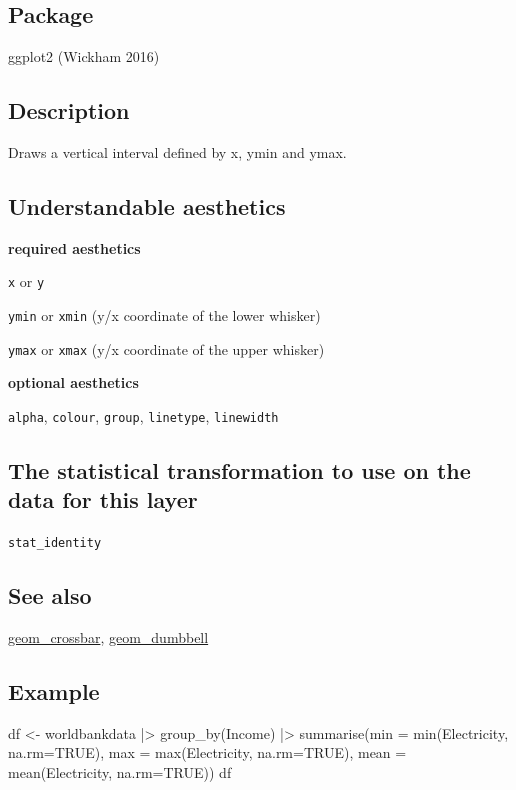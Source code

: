 \documentclass[
  letterpaper,
  DIV=11,
  numbers=noendperiod]{scrreprt}
\newenvironment{Shaded}{\begin{snugshade}}{\end{snugshade}}
\newcommand{\AttributeTok}[1]{\textcolor[rgb]{0.40,0.45,0.13}{#1}}
\newcommand{\ConstantTok}[1]{\textcolor[rgb]{0.56,0.35,0.01}{#1}}
\newcommand{\FunctionTok}[1]{\textcolor[rgb]{0.28,0.35,0.67}{#1}}
\newcommand{\NormalTok}[1]{\textcolor[rgb]{0.00,0.23,0.31}{#1}}
\newcommand{\OtherTok}[1]{\textcolor[rgb]{0.00,0.23,0.31}{#1}}
\newcommand{\SpecialCharTok}[1]{\textcolor[rgb]{0.37,0.37,0.37}{#1}}
\begin{document}
\subsection{Package}\label{package}

ggplot2 (Wickham 2016)

\subsection{Description}\label{description}

Draws a vertical interval defined by x, ymin and ymax.

\subsection{Understandable
aesthetics}\label{understandable-aesthetics-1}

\textbf{required aesthetics}

\texttt{x} or \texttt{y}

\texttt{ymin} or \texttt{xmin} (y/x coordinate of the lower whisker)

\texttt{ymax} or \texttt{xmax} (y/x coordinate of the upper whisker)

\textbf{optional aesthetics}

\texttt{alpha}, \texttt{colour}, \texttt{group}, \texttt{linetype},
\texttt{linewidth}

\subsection{The statistical transformation to use on the data for this
layer}\label{the-statistical-transformation-to-use-on-the-data-for-this-layer}

\texttt{stat\_identity}

\subsection{See also}\label{see-also}

\hyperref[crossbar]{geom\_crossbar}, \hyperref[dumbbell]{geom\_dumbbell}

\subsection{Example}\label{example-1}

\begin{Shaded}
\begin{Highlighting}[]
\NormalTok{df }\OtherTok{\textless{}{-}}\NormalTok{ worldbankdata }\SpecialCharTok{|\textgreater{}}
  \FunctionTok{group\_by}\NormalTok{(Income) }\SpecialCharTok{|\textgreater{}}
  \FunctionTok{summarise}\NormalTok{(}\AttributeTok{min =} \FunctionTok{min}\NormalTok{(Electricity, }\AttributeTok{na.rm=}\ConstantTok{TRUE}\NormalTok{), }\AttributeTok{max =} \FunctionTok{max}\NormalTok{(Electricity, }\AttributeTok{na.rm=}\ConstantTok{TRUE}\NormalTok{), }\AttributeTok{mean =} \FunctionTok{mean}\NormalTok{(Electricity, }\AttributeTok{na.rm=}\ConstantTok{TRUE}\NormalTok{))}
\NormalTok{df}
\end{Highlighting}
\end{Shaded}
\end{document}
